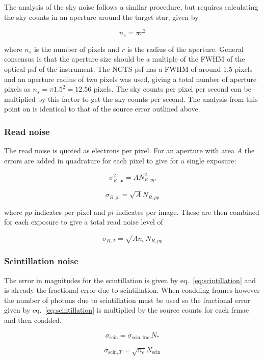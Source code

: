 \documentclass[11pt,a4paper]{report}
\begin{document}
The analysis of the sky noise follows a similar procedure, but requires
calculating the sky counts in an aperture around the target star, given
by

\[
    n_{s} = \pi r^2
    \]

where $n_s$ is the number of pixels and $r$ is the radius of the
aperture. General consensus is that the aperture size should be a
multiple of the FWHM of the optical psf of the instrument. The NGTS psf
has a FWHM of around 1.5 pixels and an aperture radius of two pixels was
used, giving a total number of aperture pixels as $n_s = \pi 1.5^2 =
12.56$ pixels. The sky counts per pixel per second can be multiplied by
this factor to get the sky counts per second. The analysis from this
point on is identical to that of the source error outlined above.

\subsubsection{Read noise}

The read noise is quoted as electrons per pixel. For an aperture with
area $A$ the errors are added in quadrature for each pixel to give for a
single exposure:

\[
    \sigma_{R,\mathrm{pi}}^2 = A N_{R,pp}^2
    \]

\[
    \sigma_{R,\mathrm{pi}} = \sqrt{A} N_{R,pp}
\]

where $pp$ indicates per pixel and $pi$ indicates per image. These 
are then combined for each exposure to give a total read noise 
level of 

\[
    \sigma_{R,T} = \sqrt{A n_e} N_{R,pp}
    \]


\subsubsection{Scintillation noise}

The error in magnitudes for the scintillation is given by
eq.~\ref{eq:scintillation} and is already the fractional error due to
scintillation. When coadding frames however the number of photons due to
scintillation must be used so the fractional error given by
eq.~\ref{eq:scintillation} is multiplied by the source counts for each
frmae and then coadded.

\[
    \sigma_{\mathrm{scin}} = \sigma_{\mathrm{scin},\mathrm{frac}} N_{\ast}
    \]

\[
    \sigma_{\mathrm{scin},T} = \sqrt{n_e} N_{\mathrm{scin}} 
\]
\end{document}
